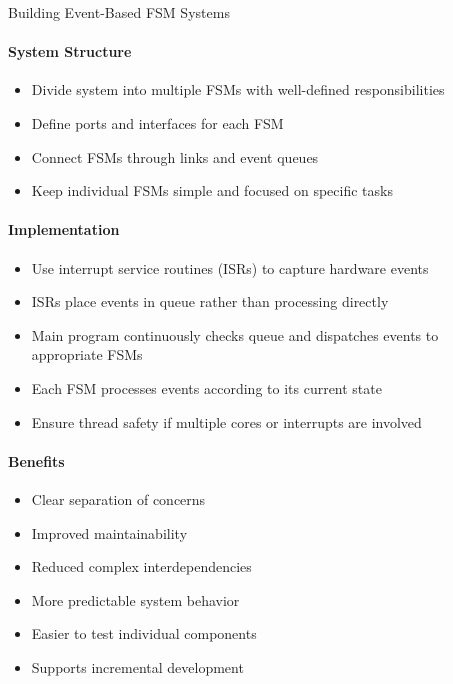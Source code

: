 \begin{KR}{Building Event-Based FSM Systems}
\paragraph{System Structure}
\begin{itemize}
    \item Divide system into multiple FSMs with well-defined responsibilities
    \item Define ports and interfaces for each FSM
    \item Connect FSMs through links and event queues
    \item Keep individual FSMs simple and focused on specific tasks
\end{itemize}

\paragraph{Implementation}
\begin{itemize}
    \item Use interrupt service routines (ISRs) to capture hardware events
    \item ISRs place events in queue rather than processing directly
    \item Main program continuously checks queue and dispatches events to appropriate FSMs
    \item Each FSM processes events according to its current state
    \item Ensure thread safety if multiple cores or interrupts are involved
\end{itemize}

\paragraph{Benefits}
\begin{itemize}
    \item Clear separation of concerns
    \item Improved maintainability
    \item Reduced complex interdependencies
    \item More predictable system behavior
    \item Easier to test individual components
    \item Supports incremental development
\end{itemize}
\end{KR}

